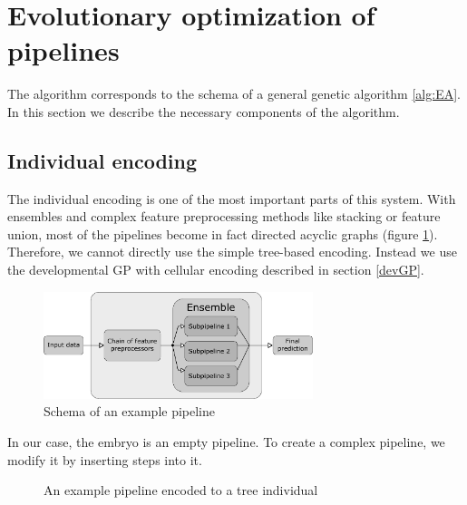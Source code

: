 



\section{Evolutionary optimization of pipelines}
The algorithm corresponds to the schema of a general genetic algorithm
\ref{alg:EA}. In this section we describe the necessary components of the
algorithm.

\subsection{Individual encoding}
The individual encoding is one of the most important parts of this system. With
ensembles and complex feature preprocessing methods like stacking or feature
union, most of the pipelines become in fact directed acyclic graphs (figure 
\ref{pic02:pipeline}). Therefore, we cannot directly use the simple tree-based
encoding. Instead we use the developmental GP with cellular encoding described
in section \ref{devGP}.
\begin{figure}[ht]\centering
\includegraphics[width=0.7\textwidth]{../img/pipeline-pdfa.pdf}
\caption{Schema of an example pipeline}
\label{pic02:pipeline}
\end{figure}

In our case, the embryo is an empty pipeline. To create a complex pipeline, we
modify it by inserting steps into it.

\begin{figure}[ht]\centering
    \qquad
    \caption{An example pipeline encoded to a tree individual}%
    \label{pic:pipeencoding}%
\end{figure}

